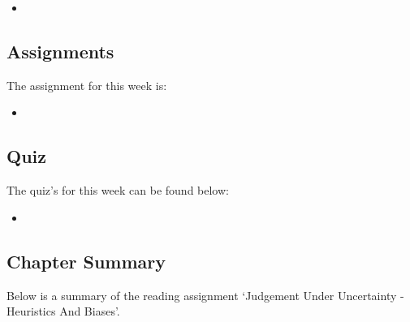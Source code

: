 \begin{itemize}
    \item {}
\end{itemize}

\subsection{Assignments}

The assignment for this week is:

\begin{itemize}
    \item {}
\end{itemize}

\subsection{Quiz}

The quiz's for this week can be found below:

\begin{itemize}
    \item {}
\end{itemize}

\newpage

\subsection{Chapter Summary}

Below is a summary of the reading assignment `Judgement Under Uncertainty - Heuristics And Biases'.

